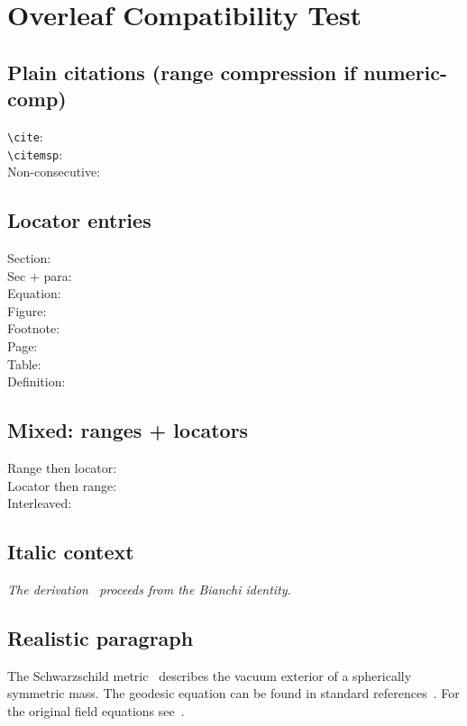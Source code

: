 \documentclass[11pt, a4paper]{article}
\begin{document}
\section*{Overleaf Compatibility Test}

\subsection*{Plain citations (range compression if numeric-comp)}

\noindent
\texttt{\textbackslash cite}: \cite{ref1,ref2,ref3,ref4,ref5} \\
\texttt{\textbackslash citemsp}:  \\
Non-consecutive: 

\subsection*{Locator entries}

\noindent
Section:      \\
Sec + para:   \\
Equation:     \\
Figure:       \\
Footnote:     \\
Page:         \\
Table:        \\
Definition:  

\subsection*{Mixed: ranges + locators}

\noindent
Range then locator:   \\
Locator then range:   \\
Interleaved:         

\subsection*{Italic context}

\textit{The derivation~ proceeds from the Bianchi identity.}

\subsection*{Realistic paragraph}

The Schwarzschild metric~ describes the vacuum exterior of
a spherically symmetric mass. The geodesic equation can be found in standard
references~. For the original field
equations see~.

\printbibliography
\end{document}
